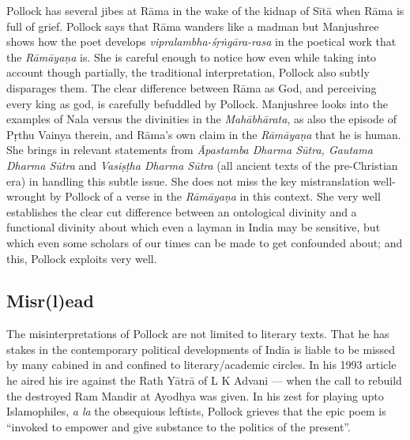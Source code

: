 Pollock has several jibes at Rāma in the wake of the kidnap of Sītā when Rāma is full of grief. Pollock says that Rāma wanders like a madman but Manjushree shows how the poet develops {\sl vipralambha-śṛṅgāra-rasa} in the poetical work that the {\sl Rāmāyaṇa} is. She is careful enough to notice how even while taking into account though partially, the traditional interpretation, Pollock also subtly disparages them. The clear difference between Rāma as God, and perceiving every king as god, is carefully befuddled by Pollock. Manjushree looks into the examples of Nala versus the divinities in the {\sl Mahābhārata}, as also the episode of Pṛthu Vainya therein, and Rāma's own claim in the {\sl Rāmāyaṇa} that he is human. She brings in relevant statements from {\sl Āpastamba Dharma Sūtra, Gautama Dharma Sūtra} and {\sl Vasiṣṭha Dharma Sūtra} (all ancient texts of the pre-Christian era) in handling this subtle issue. She does not miss the key mistranslation well-wrought by Pollock of a verse in the {\sl Rāmāyaṇa} in this context. She very well establishes the clear cut difference between an ontological divinity and a functional divinity about which even a layman in India may be sensitive, but which even some scholars of our times can be made to get confounded about; and this, Pollock exploits very well.\\[-20pt]

\subsection*{Misr(l)ead}

The misinterpretations of Pollock are not limited to literary texts. That he has stakes in the contemporary political developments of India is liable to be missed by many cabined in and confined to literary/academic circles. In his 1993 article he aired his ire against the Rath Yātrā of L K Advani --- when the call to rebuild the destroyed Ram Mandir at Ayodhya was given. In his zest for playing upto Islamophiles, {\sl a la} the obsequious leftists, Pollock grieves that the epic poem is “invoked to empower and give substance to the politics of the present”.\\[-20pt]

